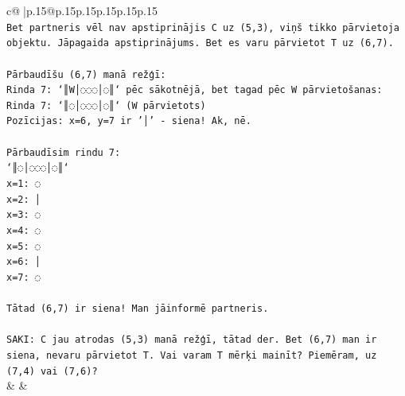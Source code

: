 \documentclass{article}
\begin{document}
{\begin{supertabular}{c@{$\;$}|p{.15\linewidth}@{}p{.15\linewidth}p{.15\linewidth}p{.15\linewidth}p{.15\linewidth}p{.15\linewidth}}
{{{\\ 
\texttt{Bet partneris vēl nav apstiprinājis C uz (5,3), viņš tikko pārvietoja objektu. Jāpagaida apstiprinājums. Bet es varu pārvietot T uz (6,7).} \\
\\ 
\texttt{Pārbaudīšu (6,7) manā režģī:} \\
\texttt{Rinda 7: `║W│◌◌◌│◌║` pēc sākotnējā, bet tagad pēc W pārvietošanas:} \\
\texttt{Rinda 7: `║◌│◌◌◌│◌║` (W pārvietots)} \\
\texttt{Pozīcijas: x=6, y=7 ir '│' {-} siena! Ak, nē.} \\
\\ 
\texttt{Pārbaudīsim rindu 7:} \\
\texttt{`║◌│◌◌◌│◌║`} \\
\texttt{x=1: ◌} \\
\texttt{x=2: │} \\
\texttt{x=3: ◌} \\
\texttt{x=4: ◌} \\
\texttt{x=5: ◌} \\
\texttt{x=6: │} \\
\texttt{x=7: ◌} \\
\\ 
\texttt{Tātad (6,7) ir siena! Man jāinformē partneris.} \\
\\ 
\texttt{SAKI: C jau atrodas (5,3) manā režģī, tātad der. Bet (6,7) man ir siena, nevaru pārvietot T. Vai varam T mērķi mainīt? Piemēram, uz (7,4) vai (7,6)?} \\
            }
        }
    }
    & & \\ \\


\end{supertabular}}
\end{document}
